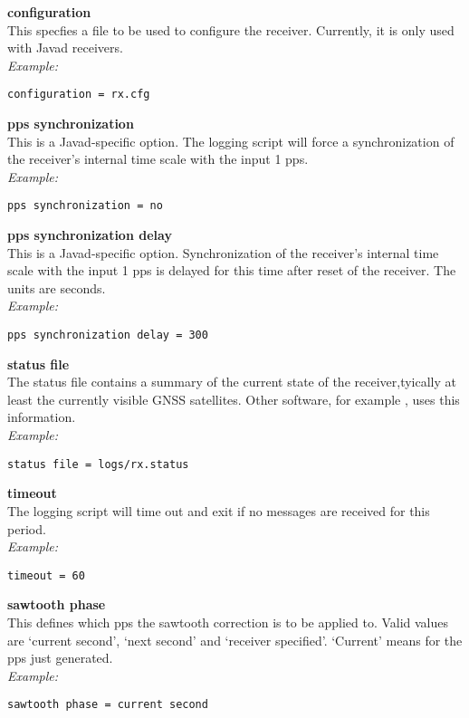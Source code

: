 {\bfseries configuration}\\ \hypertarget{h:configuration}{}
This specfies a file to be used to configure the receiver. Currently, it is only used
with Javad receivers.\\
\textit{Example:}
\begin{lstlisting}
configuration = rx.cfg
\end{lstlisting}

{\bfseries pps synchronization}\\ \hypertarget{h:pps_synchronization}{}
This is a Javad-specific option. The logging script will force a synchronization of the receiver's
internal time scale with the input 1 pps.\\
\textit{Example:}
\begin{lstlisting}
pps synchronization = no
\end{lstlisting}

{\bfseries pps synchronization delay}\\ \hypertarget{h:pps_synchronization_delay}{}
This is a Javad-specific option. Synchronization of the receiver's
internal time scale with the input 1 pps is delayed for this time after reset of the receiver.
The units are seconds.\\
\textit{Example:}
\begin{lstlisting}
pps synchronization delay = 300
\end{lstlisting}

{\bfseries status file}\\
The status file contains a summary of the current state of the receiver,tyically at least the
currently visible GNSS satellites. Other software, for example , uses this information.\\
\textit{Example:}
\begin{lstlisting}
status file = logs/rx.status
\end{lstlisting}

{\bfseries timeout}\\
The logging script will time out and exit if no messages are received for this period.\\
\textit{Example:}
\begin{lstlisting}
timeout = 60
\end{lstlisting}

{\bfseries sawtooth phase}\\
This defines which pps the sawtooth correction is to be applied to.
Valid values are `current second', `next second' and `receiver specified'.
`Current' means for the pps just generated.\\
\textit{Example:}
\begin{lstlisting}
sawtooth phase = current second
\end{lstlisting}

